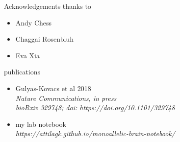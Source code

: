 \documentclass[usenames,dvipsnames]{beamer}
\begin{document}
\begin{frame}{Acknowledgements}
thanks to
\begin{itemize}
\item Andy Chess
\item Chaggai Rosenbluh
\item Eva Xia 
\end{itemize}
\vfill
publications
\begin{itemize}
\item Gulyas-Kovacs et al 2018 \\
\emph{Nature Communications, in press\\
bioRxiv 329748; doi: https://doi.org/10.1101/329748 }
\item my lab notebook\\
\emph{https://attilagk.github.io/monoallelic-brain-notebook/}
\end{itemize}
\begin{columns}[t]
\begin{column}{0.5\textwidth}
\end{column}

\begin{column}{0.5\textwidth}
\end{column}
\end{columns}
\end{frame}
\end{document}
